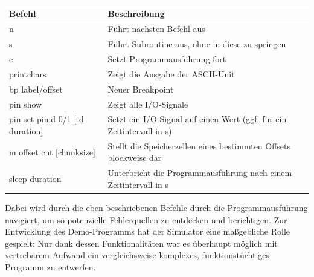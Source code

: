 \begin{center}
	\begin{tabular}{| l | l |}
	\hline
		\textbf{Befehl} & \textbf{Beschreibung} \\ \hline
		n & F\"uhrt n\"achsten Befehl aus \\ \hline
		s & F\"uhrt Subroutine aus, ohne in diese zu springen\\ \hline
		c & Setzt Programmausf\"uhrung fort \\ \hline
		printchars & Zeigt die Ausgabe der ASCII-Unit\\ \hline
		bp {label/offset} & Neuer Breakpoint\\ \hline
		pin show & Zeigt alle I/O-Signale\\ \hline
		pin set {pinid} {0/1} [-d duration] & Setzt ein I/O-Signal auf einen Wert (ggf. f\"ur ein Zeitintervall in s)\\ \hline
		 m {offset} {cnt} [chunksize] & Stellt die Speicherzellen eines bestimmten Offsets blockweise dar\\ \hline
		 sleep {duration} & Unterbricht die Programmausf\"uhrung nach einem Zeitintervall in s\\ \hline 
	\end{tabular}
\end{center}

Dabei wird durch die eben beschriebenen Befehle durch die Programmausf\"uhrung navigiert, um so potenzielle Fehlerquellen zu entdecken und berichtigen. Zur Entwicklung des Demo-Programms hat der Simulator eine ma\ss{}gebliche Rolle gespielt: Nur dank dessen Funktionalit\"aten war es \"uberhaupt m\"oglich mit vertrebarem Aufwand ein vergleichsweise komplexes, funktionst\"uchtiges Programm zu entwerfen.

